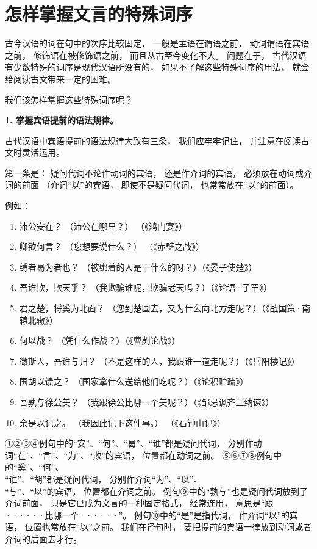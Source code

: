 \section{怎样掌握文言的特殊词序}

古今汉语的词在句中的次序比较固定，
一般是主语在谓语之前，
动词谓语在宾语之前，
修饰语在被修饰语之前，
而且从古至今变化不大。
问题在于，
古代汉语有少数特殊的词序是现代汉语所没有的，
如果不了解这些特殊词序的用法，
就会给阅读古文带来一定的困难。

我们该怎样掌握这些特殊词序呢？

\textbf{1. 掌握宾语提前的语法规律。}

古代汉语中宾语提前的语法规律大致有三条，
我们应牢牢记住，
并注意在阅读古文时灵活运用。

第一条是：
疑问代词不论作动词的宾语，
还是作介词的宾语，
必须放在动词或介词的前面
（介词“以”的宾语，
即使不是疑问代词，
也常常放在“以”的前面）。

例如：

\noindent
\begin{enumerate}[label=\textcircled{\arabic*}]
	\item 沛公安在？ （沛公在哪里？） （《鸿门宴》）
	\item 卿欲何言？ （您想要说什么？） （《赤壁之战》）
	\item 缚者曷为者也？ （被绑着的人是干什么的呀？）（《晏子使楚》）
	\item 吾谁欺，欺天乎？ （我欺骗谁呢，欺骗老天吗？）（《论语·子罕》）
	\item 君之楚，将奚为北面？ （您到楚国去，又为什么向北方走呢？）（《战国策·南辕北辙》）
	\item 何以战？ （凭什么作战？）（《曹刿论战》）
	\item 微斯人，吾谁与归？ （不是这样的人，我跟谁一道走呢？）（《岳阳楼记》）
	\item 国胡以馈之？ （国家拿什么送给他们吃呢？）（《论积贮疏》）
	\item 吾孰与徐公美？ （我跟徐公比哪一个美呢？）（《邹忌讽齐王纳谏》）
	\item 余是以记之。 （我因此记下这件事。） （《石钟山记》）
\end{enumerate}

①②③④例句中的“安”、“何”、“曷”、“谁”都是疑问代词，
分别作动词“在”、“言”、“为”、“欺”的宾语，
位置都在动词之前。
⑤⑥⑦⑧例句中的“奚”、“何”、\\ “谁”、“胡”都是疑问代词，
分别作介词“为”、“以”、\\ “与”、“以”的宾语，
位置都在介词之前。
例句⑨中的“孰与”也是疑问代词放到了介词前面，
只是它已成为文言的一种固定格式，
经常连用，
意思是“跟······比哪一个······”。
例句⑩中的“是”是指代词，
作介词“以”的宾语，
位置也常放在“以”之前。
我们在译句时，
要把提前的宾语一律放到动词或者介词的后面去才行。


